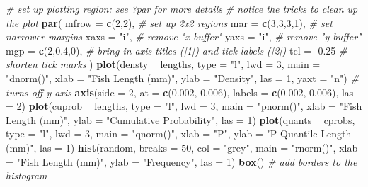 \documentclass[]{book}
\newenvironment{Shaded}{\begin{snugshade}}{\end{snugshade}}
\newcommand{\CommentTok}[1]{\textcolor[rgb]{0.56,0.35,0.01}{\textit{#1}}}
\newcommand{\DataTypeTok}[1]{\textcolor[rgb]{0.13,0.29,0.53}{#1}}
\newcommand{\DecValTok}[1]{\textcolor[rgb]{0.00,0.00,0.81}{#1}}
\newcommand{\FloatTok}[1]{\textcolor[rgb]{0.00,0.00,0.81}{#1}}
\newcommand{\KeywordTok}[1]{\textcolor[rgb]{0.13,0.29,0.53}{\textbf{#1}}}
\newcommand{\NormalTok}[1]{#1}
\newcommand{\OperatorTok}[1]{\textcolor[rgb]{0.81,0.36,0.00}{\textbf{#1}}}
\newcommand{\StringTok}[1]{\textcolor[rgb]{0.31,0.60,0.02}{#1}}
\begin{document}
\begin{Shaded}
\begin{Highlighting}[]
\CommentTok{# set up plotting region: see ?par for more details}
\CommentTok{# notice the tricks to clean up the plot}
\KeywordTok{par}\NormalTok{(}
  \DataTypeTok{mfrow =} \KeywordTok{c}\NormalTok{(}\DecValTok{2}\NormalTok{,}\DecValTok{2}\NormalTok{),    }\CommentTok{# set up 2x2 regions}
  \DataTypeTok{mar =} \KeywordTok{c}\NormalTok{(}\DecValTok{3}\NormalTok{,}\DecValTok{3}\NormalTok{,}\DecValTok{3}\NormalTok{,}\DecValTok{1}\NormalTok{),  }\CommentTok{# set narrower margins}
  \DataTypeTok{xaxs =} \StringTok{"i"}\NormalTok{,        }\CommentTok{# remove "x-buffer"}
  \DataTypeTok{yaxs =} \StringTok{"i"}\NormalTok{,        }\CommentTok{# remove "y-buffer"}
  \DataTypeTok{mgp =} \KeywordTok{c}\NormalTok{(}\DecValTok{2}\NormalTok{,}\FloatTok{0.4}\NormalTok{,}\DecValTok{0}\NormalTok{),  }\CommentTok{# bring in axis titles ([1]) and tick labels ([2])}
  \DataTypeTok{tcl =} \FloatTok{-0.25}        \CommentTok{# shorten tick marks}
\NormalTok{)}
\KeywordTok{plot}\NormalTok{(densty }\OperatorTok{~}\StringTok{ }\NormalTok{lengths, }\DataTypeTok{type =} \StringTok{"l"}\NormalTok{, }\DataTypeTok{lwd =} \DecValTok{3}\NormalTok{, }\DataTypeTok{main =} \StringTok{"dnorm()"}\NormalTok{,}
     \DataTypeTok{xlab =} \StringTok{"Fish Length (mm)"}\NormalTok{, }\DataTypeTok{ylab =} \StringTok{"Density"}\NormalTok{, }\DataTypeTok{las =} \DecValTok{1}\NormalTok{,}
     \DataTypeTok{yaxt =} \StringTok{"n"}\NormalTok{) }\CommentTok{# turns off y-axis}
\KeywordTok{axis}\NormalTok{(}\DataTypeTok{side =} \DecValTok{2}\NormalTok{, }\DataTypeTok{at =} \KeywordTok{c}\NormalTok{(}\FloatTok{0.002}\NormalTok{, }\FloatTok{0.006}\NormalTok{), }\DataTypeTok{labels =} \KeywordTok{c}\NormalTok{(}\FloatTok{0.002}\NormalTok{, }\FloatTok{0.006}\NormalTok{), }\DataTypeTok{las =} \DecValTok{2}\NormalTok{)}
\KeywordTok{plot}\NormalTok{(cuprob }\OperatorTok{~}\StringTok{ }\NormalTok{lengths, }\DataTypeTok{type =} \StringTok{"l"}\NormalTok{, }\DataTypeTok{lwd =} \DecValTok{3}\NormalTok{, }\DataTypeTok{main =} \StringTok{"pnorm()"}\NormalTok{,}
     \DataTypeTok{xlab =} \StringTok{"Fish Length (mm)"}\NormalTok{, }\DataTypeTok{ylab =} \StringTok{"Cumulative Probability"}\NormalTok{, }\DataTypeTok{las =} \DecValTok{1}\NormalTok{)}
\KeywordTok{plot}\NormalTok{(quants }\OperatorTok{~}\StringTok{ }\NormalTok{cprobs, }\DataTypeTok{type =} \StringTok{"l"}\NormalTok{, }\DataTypeTok{lwd =} \DecValTok{3}\NormalTok{, }\DataTypeTok{main =} \StringTok{"qnorm()"}\NormalTok{,}
     \DataTypeTok{xlab =} \StringTok{"P"}\NormalTok{, }\DataTypeTok{ylab =} \StringTok{"P Quantile Length (mm)"}\NormalTok{, }\DataTypeTok{las =} \DecValTok{1}\NormalTok{)}
\KeywordTok{hist}\NormalTok{(random, }\DataTypeTok{breaks =} \DecValTok{50}\NormalTok{, }\DataTypeTok{col =} \StringTok{"grey"}\NormalTok{, }\DataTypeTok{main =} \StringTok{"rnorm()"}\NormalTok{,}
     \DataTypeTok{xlab =} \StringTok{"Fish Length (mm)"}\NormalTok{, }\DataTypeTok{ylab =} \StringTok{"Frequency"}\NormalTok{, }\DataTypeTok{las =} \DecValTok{1}\NormalTok{)}
\KeywordTok{box}\NormalTok{() }\CommentTok{# add borders to the histogram}
\end{Highlighting}
\end{Shaded}
\end{document}
